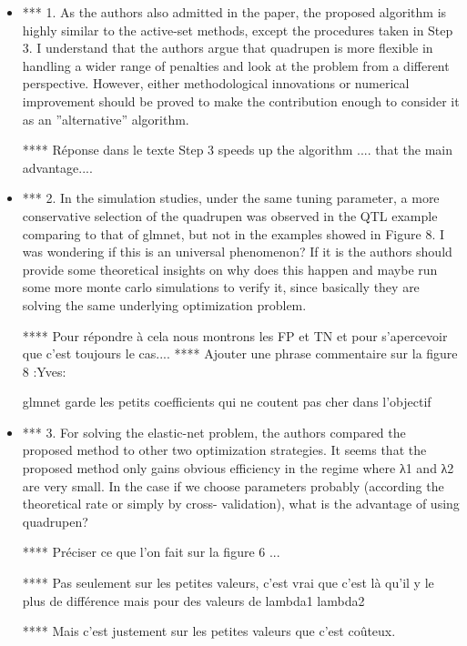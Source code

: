 \documentclass[a4paper,11pt]{texMemo}
\begin{document}
\begin{itemize}
\item
  *** 1. As the authors also admitted in the paper, the proposed algorithm is highly similar
to the active-set methods, except the procedures taken in Step 3. I understand
that the authors argue that quadrupen is more flexible in handling a wider range
of penalties and look at the problem from a different perspective. However, either
methodological innovations or numerical improvement should be proved to make the
contribution enough to consider it as an ”alternative” algorithm.

**** Réponse dans le texte 
Step 3 speeds up the algorithm .... that the main advantage....



\item 
*** 2. In the simulation studies, under the same tuning parameter, a more conservative
selection of the quadrupen was observed in the QTL example comparing to that of
glmnet, but not in the examples showed in Figure 8. I was wondering if this is an
universal phenomenon? If it is the authors should provide some theoretical insights
on why does this happen and maybe run some more monte carlo simulations to verify
it, since basically they are solving the same underlying optimization problem.

**** Pour répondre à cela nous montrons les FP et TN et pour s'apercevoir que c'est toujours le cas....
**** Ajouter une phrase commentaire sur la figure 8   :Yves:

glmnet garde les petits coefficients qui ne coutent pas cher dans l'objectif

\item 
*** 3. For solving the elastic-net problem, the authors compared the proposed method to
other two optimization strategies. It seems that the proposed method only gains
obvious efficiency in the regime where λ1 and λ2 are very small. In the case if
we choose parameters probably (according the theoretical rate or simply by cross-
validation), what is the advantage of using quadrupen?

**** Préciser ce que l'on fait sur la figure 6 ... 

**** Pas seulement sur les petites valeurs,
c'est vrai que c'est là qu'il y
le plus de différence mais pour
des valeurs de lambda1 lambda2


**** Mais c'est justement 
sur les petites valeurs que c'est coûteux.
\end{itemize}
\end{document}
